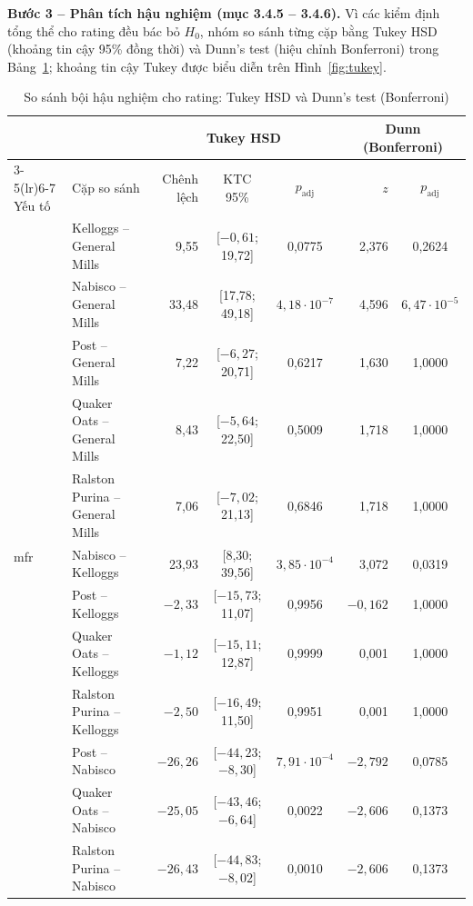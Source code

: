 \documentclass[12pt,a4paper]{article}
\begin{document}
\textbf{Bước 3 -- Phân tích hậu nghiệm (mục 3.4.5 -- 3.4.6).} Vì các kiểm định tổng thể cho
rating đều bác bỏ $H_0$, nhóm so sánh từng cặp bằng Tukey HSD (khoảng tin cậy 95\% đồng thời) và
Dunn's test (hiệu chỉnh Bonferroni) trong Bảng~\ref{tab:posthoc}; khoảng tin cậy Tukey được biểu
diễn trên Hình~\ref{fig:tukey}.

\begin{table}[H]
\centering
\caption{So sánh bội hậu nghiệm cho rating: Tukey HSD và Dunn's test (Bonferroni)}
\label{tab:posthoc}
\small
\setlength{\tabcolsep}{3.5pt}
\begin{tabular}{l l r c c r c}
\toprule
 & & \multicolumn{3}{c}{Tukey HSD} & \multicolumn{2}{c}{Dunn (Bonferroni)} \\
\cmidrule(lr){3-5}\cmidrule(lr){6-7}
Yếu tố & Cặp so sánh & Chênh lệch & KTC 95\% & $p_{\text{adj}}$ & $z$ & $p_{\text{adj}}$ \\
\midrule
\multirow{15}{*}{mfr}
 & Kelloggs -- General Mills       & 9,55   & [$-0{,}61$; 19,72]   & 0,0775 & 2,376  & 0,2624 \\
 & Nabisco -- General Mills        & 33,48  & [17,78; 49,18]       & $4{,}18\cdot10^{-7}$ & 4,596 & $6{,}47\cdot10^{-5}$ \\
 & Post -- General Mills           & 7,22   & [$-6{,}27$; 20,71]   & 0,6217 & 1,630  & 1,0000 \\
 & Quaker Oats -- General Mills    & 8,43   & [$-5{,}64$; 22,50]   & 0,5009 & 1,718  & 1,0000 \\
 & Ralston Purina -- General Mills & 7,06   & [$-7{,}02$; 21,13]   & 0,6846 & 1,718  & 1,0000 \\
 & Nabisco -- Kelloggs             & 23,93  & [8,30; 39,56]        & $3{,}85\cdot10^{-4}$ & 3,072 & 0,0319 \\
 & Post -- Kelloggs                & $-2{,}33$  & [$-15{,}73$; 11,07]  & 0,9956 & $-0{,}162$ & 1,0000 \\
 & Quaker Oats -- Kelloggs         & $-1{,}12$  & [$-15{,}11$; 12,87]  & 0,9999 & 0,001  & 1,0000 \\
 & Ralston Purina -- Kelloggs      & $-2{,}50$  & [$-16{,}49$; 11,50]  & 0,9951 & 0,001  & 1,0000 \\
 & Post -- Nabisco                 & $-26{,}26$ & [$-44{,}23$; $-8{,}30$] & $7{,}91\cdot10^{-4}$ & $-2{,}792$ & 0,0785 \\
 & Quaker Oats -- Nabisco          & $-25{,}05$ & [$-43{,}46$; $-6{,}64$] & 0,0022 & $-2{,}606$ & 0,1373 \\
 & Ralston Purina -- Nabisco       & $-26{,}43$ & [$-44{,}83$; $-8{,}02$] & 0,0010 & $-2{,}606$ & 0,1373 \\

\end{tabular}
\end{table}
\end{document}
